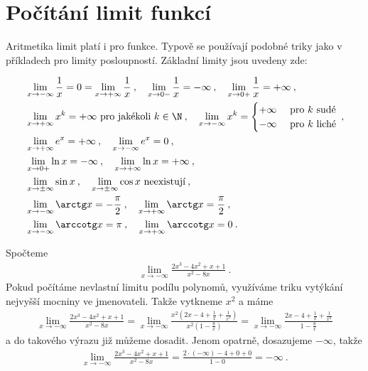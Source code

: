 \section*{Počítání limit funkcí}

Aritmetika limit platí i pro funkce. Typově se používají podobné triky jako v příkladech pro limity posloupností. Základní limity jsou uvedeny zde:

\begin{align}
    &\lim_{x \rightarrow - \infty } \frac{1}{x} = 0 = \lim_{x \rightarrow + \infty } \frac{1}{x} \:, \quad
    \lim_{x \rightarrow 0-} \frac{1}{x} = - \infty \:, \quad \lim_{x \rightarrow 0+} \frac{1}{x} = + \infty \:, \\
    &\lim_{x \rightarrow + \infty} x^k = + \infty \text{ pro jakékoli } k \in \N \:, \quad
    \lim_{x \rightarrow - \infty} x^k = \begin{cases}
        + \infty & \text{ pro } k \text{ sudé} \\
        - \infty & \text{ pro } k \text{ liché}
    \end{cases} \:, \\
    &\lim_{x \rightarrow +\infty} e^x = + \infty \:, \quad \lim_{x \rightarrow -\infty} e^x = 0 \:, \\
    &\lim_{x \rightarrow 0+} \ln x = - \infty \:, \quad \lim_{x \rightarrow +\infty} \ln x = + \infty \:,\\
    &\lim_{x \rightarrow \pm \infty} \sin x \:, \quad \lim_{x \rightarrow \pm \infty} \cos x  \text{ neexistují} \:, \\
    &\lim_{x \rightarrow -\infty} \arctg x = - \frac{\pi}{2} \:, \quad \lim_{x \rightarrow +\infty} \arctg x = \frac{\pi}{2} \:, \\
    &\lim_{x \rightarrow -\infty} \arccotg x = \pi \:, \quad \lim_{x \rightarrow +\infty} \arccotg x = 0 \:.
\end{align}


\begin{example}
    Spočteme
    \begin{align}
        \lim_{x \rightarrow -\infty} \frac{2x^3-4x^2+x+1}{x^2-8x} \:.
    \end{align}
    Pokud počítáme nevlastní limitu podílu polynomů, využíváme triku vytýkání nejvyšší mocniny ve jmenovateli. Takže vytkneme $x^2$ a máme
    \begin{align}
        \lim_{x \rightarrow -\infty} \frac{2x^3-4x^2+x+1}{x^2-8x} =
        \lim_{x \rightarrow -\infty} \frac{x^2 \left( 2x - 4 + \frac{1}{x} + \frac{1}{x^2}\right)}{x^2 \left( 1 - \frac{8}{x} \right)} =
        \lim_{x \rightarrow -\infty} \frac{2x - 4 + \frac{1}{x} + \frac{1}{x^2}}{1 - \frac{8}{x}}
    \end{align}
    a do takového výrazu již můžeme dosadit. Jenom opatrně, dosazujeme $-\infty$, takže
    \begin{align}
        \lim_{x \rightarrow -\infty} \frac{2x^3-4x^2+x+1}{x^2-8x} = \frac{2 \cdot (-\infty) - 4 + 0 + 0}{1 - 0} = - \infty \:.
    \end{align}
\end{example}


